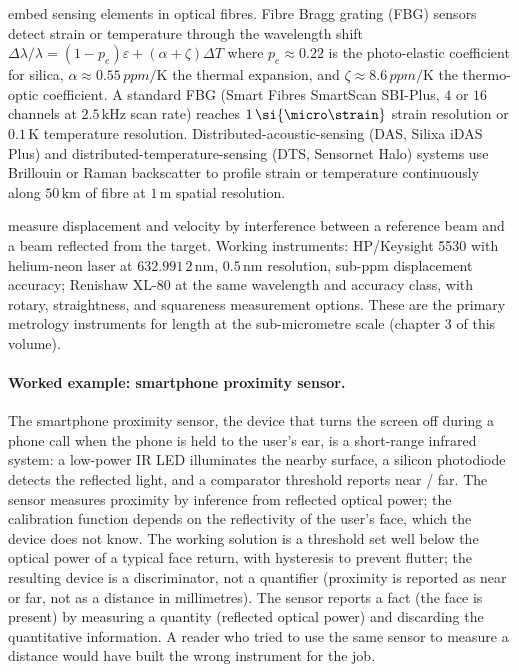  embed sensing elements in optical
fibres. Fibre Bragg grating (FBG) sensors detect strain or
temperature through the wavelength shift $\Delta\lambda/\lambda =
(1 - p_{e})\varepsilon + (\alpha + \zeta)\Delta T$ where
$p_{e} \approx 0.22$ is the photo-elastic coefficient for silica,
$\alpha \approx 0.55\,\si{ppm/\kelvin}$ the thermal expansion,
and $\zeta \approx 8.6\,\si{ppm/\kelvin}$ the thermo-optic
coefficient. A standard FBG (Smart Fibres SmartScan SBI-Plus, $4$
or $16$ channels at $2.5\,\si{\kilo\hertz}$ scan rate) reaches
$1\,\si{\micro\strain}$ strain resolution or $0.1\,\si{\kelvin}$
temperature resolution. Distributed-acoustic-sensing (DAS,
Silixa iDAS Plus) and distributed-temperature-sensing (DTS,
Sensornet Halo) systems use Brillouin or Raman backscatter to
profile strain or temperature continuously along $50\,\si{\kilo
\meter}$ of fibre at $1\,\si{\meter}$ spatial resolution.

 measure displacement and velocity
by interference between a reference beam and a beam reflected
from the target. Working instruments: HP/Keysight 5530 with
helium-neon laser at $632.991\,2\,\si{\nano\meter}$, $0.5\,\si{
\nano\meter}$ resolution, sub-ppm displacement accuracy; Renishaw
XL-80 at the same wavelength and accuracy class, with rotary,
straightness, and squareness measurement options. These are the
primary metrology instruments for length at the sub-micrometre
scale (chapter 3 of this volume).

\paragraph{Worked example: smartphone proximity sensor.} The
smartphone proximity sensor, the device that turns the screen off
during a phone call when the phone is held to the user's ear, is a
short-range infrared system: a low-power IR LED illuminates the
nearby surface, a silicon photodiode detects the reflected light,
and a comparator threshold reports near / far. The sensor measures
proximity by inference from reflected optical power; the calibration
function depends on the reflectivity of the user's face, which the
device does not know. The working solution is a threshold set well
below the optical power of a typical face return, with hysteresis to
prevent flutter; the resulting device is a discriminator, not a
quantifier (proximity is reported as near or far, not as a distance
in millimetres). The sensor reports a fact (the face is present) by
measuring a quantity (reflected optical power) and discarding the
quantitative information. A reader who tried to use the same sensor
to measure a distance would have built the wrong instrument for the
job.

